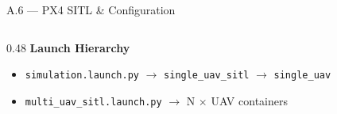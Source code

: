 \documentclass[aspectratio=169, 10pt]{beamer}
\begin{document}
\begin{frame}{A.6 --- PX4 SITL \& Configuration}
\begin{columns}[T]
\begin{column}{0.48\textwidth}
\vspace{0.5em}
\normalsize
\textbf{Launch Hierarchy}
\begin{itemize}\scriptsize
  \item \texttt{simulation.launch.py} $\to$ \texttt{single\_uav\_sitl} $\to$ \texttt{single\_uav}
  \item \texttt{multi\_uav\_sitl.launch.py} $\to$ N $\times$ UAV containers
\end{itemize}
\end{column}
\end{columns}
\end{frame}
\end{document}
